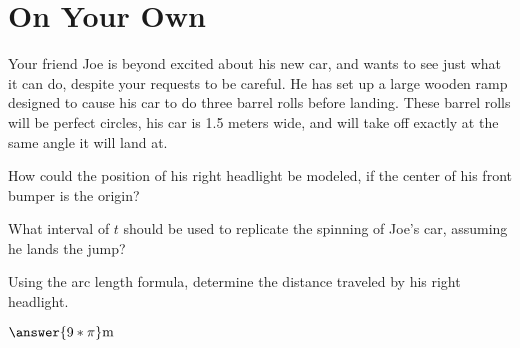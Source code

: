 \documentclass{ximera}
\begin{document}
\section{On Your Own}
\begin{question}
\item Your friend Joe is beyond excited about his new car, and wants to see just what it can do, despite your requests to be careful. He has set up a large wooden ramp designed to cause his car to do three barrel rolls before landing. These barrel rolls will be perfect circles, his car is 1.5 meters wide, and will take off exactly at the same angle it will land at.

How could the position of his right headlight be modeled, if the center of his front bumper is the origin?

\begin{multipleChoice}
\end{multipleChoice}

What interval of $t$ should be used to replicate the spinning of Joe's car, assuming he lands the jump?

\begin{multipleChoice}
\end{multipleChoice}

Using the arc length formula, determine the distance traveled by his right headlight.

\begin{onlineOnly}
\begin{sageCell}

\end{sageCell}
\end{onlineOnly}

$\answer{9*\pi}\text{m}$


\end{question}
\end{document}
